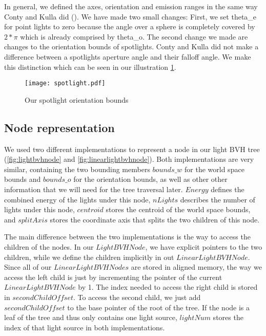 In general, we defined the axes, orientation and emission ranges in the same way Conty and Kulla did (\Cite{MLS}). We have made two small changes: First, we set theta\_e for point lights to zero because the angle over a sphere is completely covered by $2 * \pi$ which is already comprised by theta\_o. The second change we made are changes to the orientation bounds of spotlights. Conty and Kulla did not make a difference between a spotlights aperture angle and their falloff angle. We make this distinction which can be seen in our illustration \ref{fig:spotlight}.

\begin{figure}
	\begin{center}
		\texttt{[image: spotlight.pdf]}
		\caption{Our spotlight orientation bounds}
		\label{fig:spotlight}
	\end{center}
\end{figure}

\subsection{Node representation}

We used two different implementations to represent a node in our light BVH tree (\ref{fig:lightbvhnode} and \ref{fig:linearlightbvhnode}). Both implementations are very similar, containing the two bounding members $bounds\_w$ for the world space bounds and $bounds\_o$ for the orientation bounds, as well as other other information that we will need for the tree traversal later. $Energy$ defines the combined energy of the lights under this node, $nLights$ describes the number of lights under this node, $centroid$ stores the centroid of the world space bounds, and $splitAxis$ stores the coordinate axis that splits the two children of this node. 

The main difference between the two implementations is the way to access the children of the nodes. In our $LightBVHNode$, we have explicit pointers to the two children, while we define the children implicitly in out $LinearLightBVHNode$. Since all of our $LinearLightBVHNodes$ are stored in aligned memory, the way we access the left child is just by incrementing the pointer of the current $LinearLightBVHNode$ by 1. The index needed to access the right child is stored in $secondChildOffset$. To access the second child, we just add $secondChildOffset$ to the base pointer of the root of the tree. If the node is a leaf of the tree and thus only contains one light source, $lightNum$ stores the index of that light source in both implementations.

